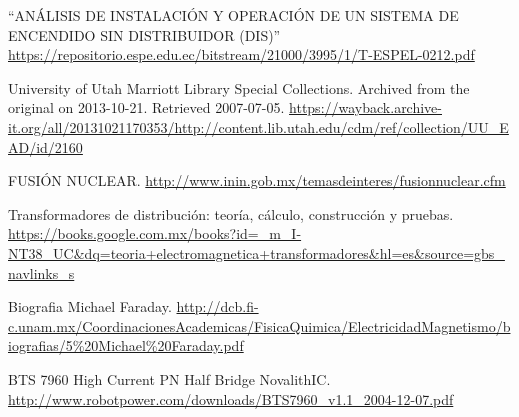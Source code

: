 \documentclass[twoside,22pt]{Latex/Classes/thesisUMSNH}
\begin{document}
\begin{thebibliography}{2}
``ANÁLISIS DE INSTALACIÓN Y OPERACIÓN DE UN
SISTEMA DE ENCENDIDO SIN DISTRIBUIDOR (DIS)'' \url{https://repositorio.espe.edu.ec/bitstream/21000/3995/1/T-ESPEL-0212.pdf}

University of Utah Marriott Library Special Collections. Archived from the original on 2013-10-21. Retrieved 2007-07-05. \url{https://wayback.archive-it.org/all/20131021170353/http://content.lib.utah.edu/cdm/ref/collection/UU_EAD/id/2160}

FUSIÓN NUCLEAR. \url{http://www.inin.gob.mx/temasdeinteres/fusionnuclear.cfm}

Transformadores de distribución: teoría, cálculo, construcción y pruebas. \url{https://books.google.com.mx/books?id=_m_I-NT38_UC&dq=teoria+electromagnetica+transformadores&hl=es&source=gbs_navlinks_s}

Biografia Michael Faraday. \url{http://dcb.fi-c.unam.mx/CoordinacionesAcademicas/FisicaQuimica/ElectricidadMagnetismo/biografias/5\%20Michael\%20Faraday.pdf}

BTS 7960 High Current PN Half Bridge NovalithIC. \url{http://www.robotpower.com/downloads/BTS7960_v1.1_2004-12-07.pdf}





\end{thebibliography}
\end{document}

